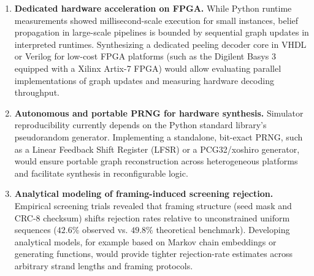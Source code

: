 \begin{enumerate}
    \item \textbf{Dedicated hardware acceleration on FPGA.}
    While Python runtime measurements showed millisecond-scale execution for small instances, belief propagation in large-scale pipelines is bounded by sequential graph updates in interpreted runtimes. Synthesizing a dedicated peeling decoder core in VHDL or Verilog for low-cost FPGA platforms (such as the Digilent Basys 3 equipped with a Xilinx Artix-7 FPGA) would allow evaluating parallel implementations of graph updates and measuring hardware decoding throughput.

    \item \textbf{Autonomous and portable PRNG for hardware synthesis.}
    Simulator reproducibility currently depends on the Python standard library's pseudorandom generator. Implementing a standalone, bit-exact PRNG, such as a Linear Feedback Shift Register (LFSR) or a PCG32/xoshiro generator, would ensure portable graph reconstruction across heterogeneous platforms and facilitate synthesis in reconfigurable logic.

    \item \textbf{Analytical modeling of framing-induced screening rejection.}
    Empirical screening trials revealed that framing structure (seed mask and CRC-8 checksum) shifts rejection rates relative to unconstrained uniform sequences ($42.6\%$ observed vs. $49.8\%$ theoretical benchmark). Developing analytical models, for example based on Markov chain embeddings or generating functions, would provide tighter rejection-rate estimates across arbitrary strand lengths and framing protocols.
\end{enumerate}
